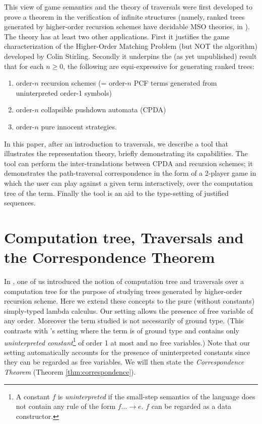 This view of game semantics and the theory of traversals were first developed to prove a theorem in the verification of infinite structures (namely, ranked trees generated by higher-order recursion schemes have decidable MSO theories, in \cite{OngLics2006}). The theory has at least two other applications. First it justifies the game characterization of the Higher-Order Matching Problem (but NOT the algorithm) developed by Colin Stirling. Secondly it underpins the (as yet unpublished) result that for each $n \geq 0$, the following are equi-expressive for generating ranked trees:
\begin{enumerate}
\item order-$n$ recursion schemes (= order-$n$ PCF terms generated from uninterpreted order-1 symbols)

\item order-$n$ collapsible pushdown automata (CPDA)

\item order-$n$ pure innocent strategies.
\end{enumerate}

In this paper, after an introduction to traversals, we describe a tool that illustrates the representation theory, briefly demonstrating its capabilities. The tool can perform the inter-translations between CPDA and recursion schemes; it demonstrates the path-traversal correspondence in the form of a 2-player game in which the user can play against a given term interactively, over the computation tree of the term. Finally the tool is an aid to the type-setting of justified sequences.

\section{Computation tree, Traversals and the Correspondence Theorem}

In \cite{OngLics2006}, one of us introduced the notion of computation tree and traversals over a computation tree for the purpose of studying trees generated by higher-order recursion scheme. Here we extend these concepts to the pure (\ie without constants) simply-typed lambda calculus. Our setting allows the presence of free variable of any order. Moreover the term studied is not necessarily of ground type. (This contrasts with \cite{OngLics2006}'s setting where the term is of ground type and contains only \emph{uninterpreted constant}\footnote{A constant $f$ is  \emph{uninterpreted} if the small-step semantics of the language
  does not contain any rule of the form $f \dots \rightarrow e$. $f$
  can be regarded as a data constructor.} of order 1 at most and no
free variables.) Note that our setting automatically accounts for the presence of uninterpreted constants since they can be regarded as free variables. We will then state the \emph{Correspondence Theorem} (Theorem \ref{thm:correspondence}).

